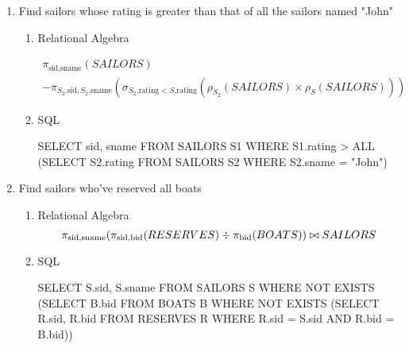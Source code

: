 \begin{enumerate}
    \item  Find sailors whose rating is greater than that of all the sailors named "John"
          \begin{enumerate}
              \item Relational Algebra

                    \begin{multline*}
                        \pi_{\text{sid}, \text{sname}}(SAILORS) \\
                        - \pi_{S_2.\text{sid},S_2.\text{sname}}(\sigma_{S_2.\text{rating} < S.\text{rating}}(\rho_{S_2}(SAILORS)\times \rho_S(SAILORS)))
                    \end{multline*}

              \item SQL

                    \begin{sqlQuery}{}
                        SELECT sid, sname FROM SAILORS S1
                        WHERE S1.rating > ALL
                                (SELECT S2.rating FROM SAILORS S2
                                WHERE S2.sname = "John")
                    \end{sqlQuery}

          \end{enumerate}

    \item Find sailors who've reserved all boats

          \begin{enumerate}
              \item Relational Algebra
                    \begin{equation*}
                        \pi_{\text{sid}, \text{sname}}(\pi_{\text{sid}, \text{bid}}(RESERVES) \div \pi_{\text{bid}}(BOATS)) \\
                        \bowtie SAILORS
                    \end{equation*}
                    \pagebreak
              \item SQL
                    \begin{sqlQuery}{}
							SELECT S.sid, S.sname
							FROM SAILORS S
							WHERE NOT EXISTS
								(SELECT B.bid
								FROM BOATS B
								WHERE NOT EXISTS
									(SELECT R.sid, R.bid
									FROM RESERVES R
									WHERE R.sid = S.sid
										AND R.bid = B.bid))
						\end{sqlQuery}
          \end{enumerate}


\end{enumerate}
